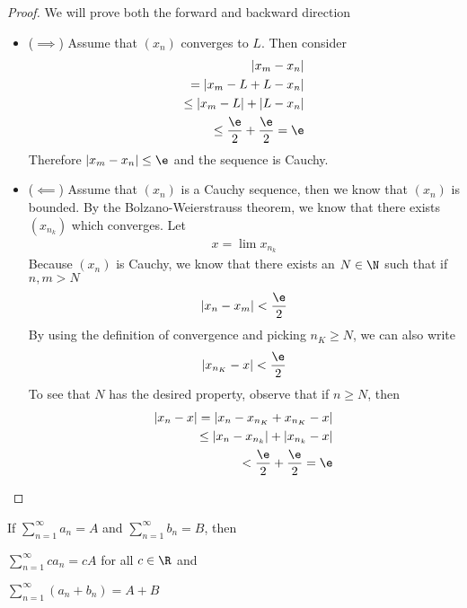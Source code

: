\begin{proof}
	We will prove both the forward and backward direction
	\begin{itemize}
		\item ($\implies$) Assume that $\left( x_n \right) $ converges to $L$. Then consider
			\begin{align}
				\left|x_m - x_n\right|\\
				=\left|x_m - L + L - x_n\right|\\
				\le \left|x_m - L\right| + \left|L - x_n\right|\\
				\le \frac{\e}{2} + \frac{\e}{2} = \e
			\end{align}
			Therefore $\left|x_m - x_n\right| \le \e$ and the sequence is Cauchy.
		\item ($\impliedby$) Assume that $\left( x_n \right) $ is a Cauchy sequence, then we know that $\left( x_n \right) $ is bounded. By the Bolzano-Weierstrauss theorem, we know that there exists $\left( x_{n_k} \right) $ which converges. Let
			\begin{align}
				x = \lim_{} x_{n_k}
			\end{align}
			Because $\left( x_n \right) $ is Cauchy, we know that there exists an $N \in \N$ such that if $n, m > N$
			\begin{align}
				\left|x_n - x_m\right| < \frac{\e}{2}
			\end{align}
			By using the definition of convergence and picking $n_K \ge N$, we can also write
			\begin{align}
				\left|x_{n_K} - x\right| < \frac{\e}{2}
			\end{align}
			To see that $N$ has the desired property, observe that if $n \ge N$, then
			\begin{align}
				\left|x_n - x\right| = \left|x_n - x_{n_K} + x_{n_K} - x\right| \\
				\le \left|x_n - x_{n_k}\right| + \left|x_{n_k} - x\right|\\
				< \frac{\e}{2} + \frac{\e}{2} = \e
			\end{align}
	\end{itemize}	
\end{proof}

\begin{theorem}
	If $\sum_{n=1}^{\infty} a_n = A$ and $\sum_{n=1}^{\infty} b_n = B$, then
	\begin{romanize}
		\item $\sum_{n=1}^{\infty} c a_n = cA$ for all $c \in \R$ and
		\item $\sum_{n=1}^{\infty} \left( a_n + b_n \right) = A + B$
	\end{romanize}
\end{theorem}

